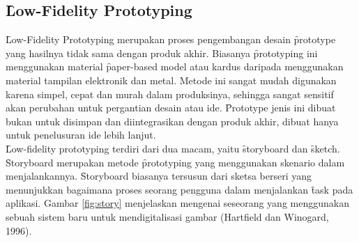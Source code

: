 \subsection{\f{Low-Fidelity Prototyping}}
\f{Low-Fidelity Prototyping} merupakan proses pengembangan desain \f{prototype} yang hasilnya tidak sama dengan produk akhir. Biasanya \f{prototyping} ini menggunakan material \f{paper-based model} atau kardus daripada menggunakan material tampilan elektronik dan metal. Metode ini sangat mudah digunakan karena simpel, cepat dan murah dalam produksinya, sehingga sangat sensitif akan perubahan untuk pergantian desain atau ide. \f{Prototype} jenis ini dibuat bukan untuk disimpan dan diintegrasikan dengan produk akhir, dibuat hanya untuk penelusuran ide lebih lanjut. 
\newline\\
\f{Low-fidelity prototyping} terdiri dari dua macam, yaitu \f{storyboard} dan \f{sketch}. \f{Storyboard} merupakan metode \f{prototyping} yang menggunakan skenario dalam menjalankannya. \f{Storyboard} biasanya tersusun dari sketsa berseri yang menunjukkan bagaimana proses seorang pengguna dalam menjalankan \f{task} pada aplikasi. Gambar \ref{fig:story} menjelaskan mengenai seseorang yang menggunakan sebuah sistem baru untuk mendigitalisasi gambar (Hartfield dan Winogard, 1996).

